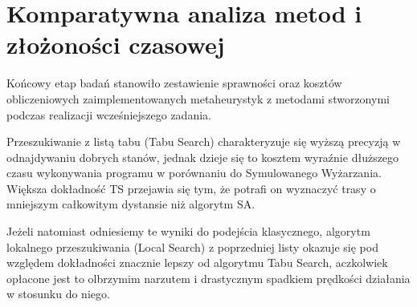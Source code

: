 \documentclass[12pt,a4paper]{article}
\begin{document}
\section{Komparatywna analiza metod i złożoności czasowej}
Końcowy etap badań stanowiło zestawienie sprawności oraz kosztów obliczeniowych zaimplementowanych metaheurystyk z metodami stworzonymi podczas realizacji wcześniejszego zadania.

Przeszukiwanie z listą tabu (Tabu Search) charakteryzuje się wyższą precyzją w odnajdywaniu dobrych stanów, jednak dzieje się to kosztem wyraźnie dłuższego czasu wykonywania programu w porównaniu do Symulowanego Wyżarzania. Większa dokładność TS przejawia się tym, że potrafi on wyznaczyć trasy o mniejszym całkowitym dystansie niż algorytm SA.

Jeżeli natomiast odniesiemy te wyniki do podejścia klasycznego, algorytm lokalnego przeszukiwania (Local Search) z poprzedniej listy okazuje się pod względem dokładności znacznie lepszy od algorytmu Tabu Search, aczkolwiek opłacone jest to olbrzymim narzutem i drastycznym spadkiem prędkości działania w stosunku do niego.
\end{document}
